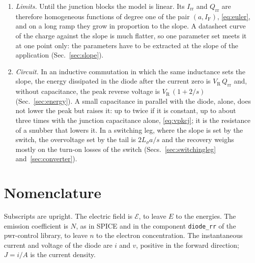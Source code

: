 \documentclass[10pt,a4paper]{scrartcl}
\newcommand{\IF}{I_\mathrm{F}}
\newcommand{\VR}{V_\mathrm{R}}
\newcommand{\Irr}{I_\mathrm{rr}}
\newcommand{\Qrr}{Q_\mathrm{rr}}
\newcommand{\Nem}{N}                          %
\newcommand{\Ls}{L_\sigma}                    %
\newcommand{\Ef}{\mathcal{E}}                 %
\begin{document}
\begin{enumerate}
\item \emph{Limits.} Until the junction blocks the model is linear. Its $\Irr$ and $\Qrr$ are therefore homogeneous functions of degree one of the pair $(a, \IF)$, \eqref{eq:euler}, and on a long ramp they grow in proportion to the slope. A datasheet curve of the charge against the slope is much flatter, so one parameter set meets it at one point only: the parameters have to be extracted at the slope of the application (Sec.~\ref{sec:slope}).
\item \emph{Circuit.} In an inductive commutation in which the same inductance sets the slope, the energy dissipated in the diode after the current zero is $\VR\,\Qrr$ and, without capacitance, the peak reverse voltage is $\VR\,(1+2/s)$ (Sec.~\ref{sec:energy}). A small capacitance in parallel with the diode, alone, does not lower the peak but raises it: up to twice if it is constant, up to about three times with the junction capacitance alone, \eqref{eq:vpkcj}; it is the resistance of a snubber that lowers it. In a switching leg, where the slope is set by the switch, the overvoltage set by the tail is $2\Ls a/s$ and the recovery weighs mostly on the turn-on losses of the switch (Secs.~\ref{sec:switchingleg} and~\ref{sec:converter}).
\end{enumerate}

\section{Nomenclature}
\label{sec:nomenclature}
Subscripts are upright. The electric field is $\Ef$, to leave $E$ to the energies. The emission coefficient is $\Nem$, as in SPICE and in the component \texttt{diode\_rr} of the pwr-control library, to leave $n$ to the electron concentration. The instantaneous current and voltage of the diode are $i$ and $v$, positive in the forward direction; $J = i/A$ is the current density.
\end{document}
